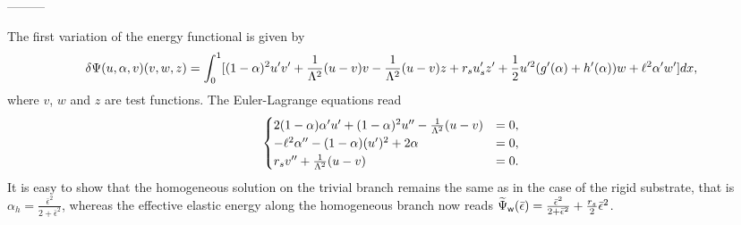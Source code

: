 ---------




The first variation of the energy functional is given by
\begin{equation}
\delta \Psi(u,\alpha, v)(v,w,z)=\int_0^1 [(1-\alpha)^2u'v'+\frac{1}{\Lambda^2} (u- v) v-\frac{1}{\Lambda^2} (u- v) z+r_su'_sz'+\frac{1}{2}u'^2 (g'(\alpha)+h'(\alpha))w+\ell^2\alpha'w' ]dx,\label{firstvar}
\end{equation}
where $v$, $w$ and $z$ are  test functions. The Euler-Lagrange equations read
\begin{eqnarray}\label{modeld_el_1}
\begin{cases}
  2(1-\alpha)\alpha' u' +(1-\alpha)^2 u'' -  \frac{1}{\Lambda^2}(u-v) &= 0, \\
  -\ell^2\alpha'' - (1-\alpha)( u')^2 + 2\alpha   &= 0,\\
    r_s v''  +  \frac{1}{\Lambda^2}(u-v) &= 0. \\
\end{cases}
\label{auto2}
\end{eqnarray}
It is easy to show that the homogeneous solution on the trivial branch remains the same as in the case of the rigid substrate, that is $\alpha_h = \frac{\bar{\epsilon}^2}{2 + \bar{\epsilon}^2}\label{eq:homo11}$, whereas the effective elastic energy along the homogeneous branch now reads $\widetilde \Psi_{\mathsf{w}}(\bar{\epsilon}) = \frac{\bar{\epsilon}^2}{2 + \bar{\epsilon}^2} + \frac{r_s}{2}\bar{\epsilon}^2$. 

